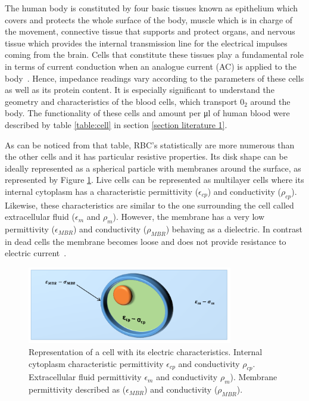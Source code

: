 The human body is constituted by four basic tissues known as epithelium which covers and protects the whole surface of the body, muscle which is in charge of the movement, connective tissue that supports and protect organs, and nervous tissue which provides the internal transmission line for the electrical impulses coming from the brain. Cells that constitute these tissues play a fundamental role in terms of current conduction when an analogue current (AC) is applied to the body~\cite{lvovich2012impedance}. Hence, impedance readings vary according to the parameters of these cells as well as its protein content. It is especially significant to understand the geometry and characteristics of the blood cells, which transport $0_2$ around the body. The functionality of these cells and amount per \si{\micro\litre} of human blood were described by table \ref{table:cell} in section \ref{section literature 1}.

As can be noticed from that table, RBC's statistically are more numerous than the other cells and it has particular resistive properties. Its disk shape can be ideally represented as a spherical particle with membranes around the surface, as represented by Figure \ref{fig:cell}. Live cells can be represented as multilayer cells where its internal cytoplasm has a characteristic permittivity ($\epsilon_{cp}$) and conductivity ($\rho_{cp}$). Likewise, these characteristics are similar to the one surrounding the cell called extracellular fluid ($\epsilon_m$ and $\rho_m$). However, the membrane has a very low permittivity ($\epsilon_{MBR}$) and conductivity ($\rho_{MBR}$) behaving as a dielectric. In contrast in dead cells the membrane becomes loose and does not provide resistance to electric current~\cite{lvovich2012impedance}.

\begin{figure}[!htpb]
	\centering
	\includegraphics[width=0.8\textwidth,keepaspectratio, trim={0cm 0cm 0cm 0cm},clip]{figure1}    
	\caption[Cell permeability and conductivity distribution]{Representation of a cell with its electric characteristics. Internal cytoplasm characteristic permittivity $\epsilon_{cp}$ and conductivity $\rho_{cp}$. Extracellular fluid permittivity $\epsilon_m$ and conductivity $\rho_m$). Membrane permittivity described as ($\epsilon_{MBR}$) and conductivity ($\rho_{MBR}$).}
	\label{fig:cell}
\end{figure}

